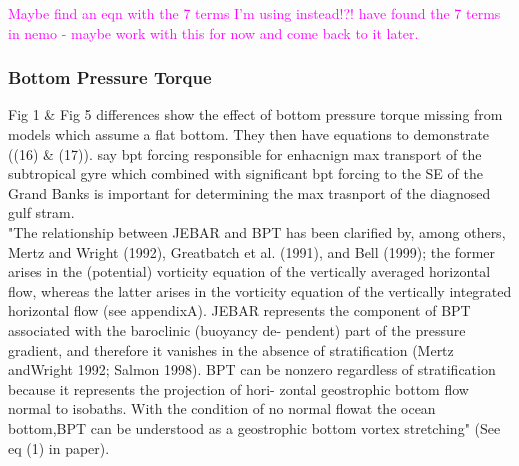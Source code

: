 \documentclass[..\EOYR.tex]{subfiles}
\begin{document}
\textcolor{magenta}{Maybe find an eqn with the 7 terms I'm using instead!?! have found the 7 terms in nemo - maybe work with this for now and come back to it later.}






\subsubsection*{Bottom Pressure Torque}
\citep{Greatbatch1991} Fig 1 \& Fig 5 differences show the effect of bottom pressure torque missing from models which assume a flat bottom. They then have equations to demonstrate ((16) \& (17)). \citep{Greatbatch1991} say bpt forcing responsible for enhacnign max transport of the subtropical gyre which combined with significant bpt forcing to the SE of the Grand Banks is important for determining the max trasnport of the diagnosed gulf stram. \\
\citep{Yeager2015} "The relationship between JEBAR and BPT has been clarified by, among others, Mertz and Wright (1992), Greatbatch et al. (1991), and Bell (1999); the former arises in the (potential) vorticity equation of the vertically averaged horizontal flow, whereas the latter arises in the vorticity equation of the vertically integrated horizontal flow (see appendixA). JEBAR represents the component of BPT associated with the baroclinic (buoyancy de- pendent) part of the pressure gradient, and therefore it vanishes in the absence of stratification (Mertz andWright 1992; Salmon 1998). BPT can be nonzero regardless of stratification because it represents the projection of hori- zontal geostrophic bottom flow normal to isobaths. With the condition of no normal flowat the ocean bottom,BPT can be understood as a geostrophic bottom vortex stretching" (See eq (1) in paper).
\end{document}
